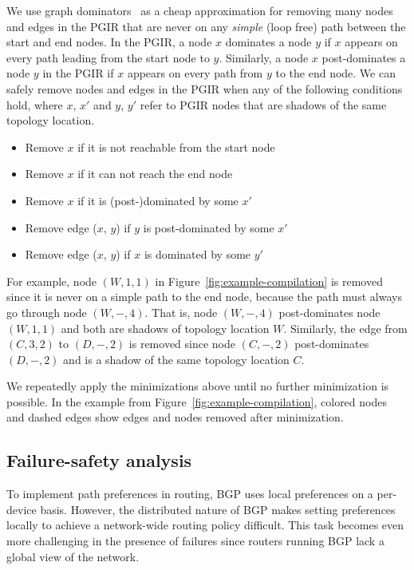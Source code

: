 \documentclass[10pt]{sigalternate052015}
\begin{document}
We use graph dominators~\cite{tarjan-dominance} as a cheap approximation for removing many nodes and edges in the PGIR that are never on any \emph{simple} (loop free) path between the start and end nodes.
In the PGIR, a node $x$ dominates a node $y$ if $x$ appears on every path leading from the start node to $y$. Similarly, a node $x$ post-dominates a node $y$ in the PGIR if $x$ appears on every path from $y$ to the end node.
We can safely remove nodes and edges in the PGIR when any of the following conditions hold, where $x$, $x'$ and $y$, $y'$ refer to PGIR nodes that are shadows of the same topology location.
\begin{itemize}
\setlength{\itemsep}{1pt}
\setlength{\parskip}{0pt}
\setlength{\parsep}{0pt}
\item Remove $x$ if it is not reachable from the start node
\item Remove $x$ if it can not reach the end node
\item Remove $x$ if it is (post-)dominated by some $x'$
\item Remove edge ($x$, $y$) if $y$ is post-dominated by some $x'$
\item Remove edge ($x$, $y$) if $x$ is dominated by some $y'$
\end{itemize}
For example, node $(W,1,1)$ in Figure~\ref{fig:example-compilation} is removed since it is never on a simple path to the end node, because the path must always go through node $(W,-,4)$. That is, node $(W,-,4)$ post-dominates node $(W,1,1)$ and both are shadows of topology location $W$.
Similarly, the edge from $(C,3,2)$ to $(D,-,2)$ is removed since node $(C,-,2)$ post-dominates $(D,-,2)$ and is a shadow of the same topology location $C$.

We repeatedly apply the minimizations above until no further minimization is possible.
In the example from Figure~\ref{fig:example-compilation}, colored nodes and dashed edges show edges and nodes removed after minimization.


\subsection{Failure-safety analysis}

To implement path preferences in routing, BGP uses local preferences on a per-device basis. However, the distributed nature of BGP makes setting preferences locally to achieve a network-wide routing policy difficult. This task becomes even more challenging in the presence of failures since routers running BGP lack a global view of the network.
\end{document}
